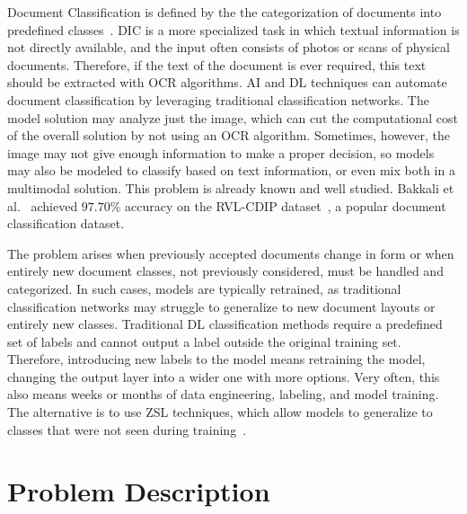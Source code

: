 Document Classification is defined by the the categorization of documents into predefined classes~\cite{liu_document_2021}. \gls{DIC} is a more specialized task in which textual information is not directly available, and the input often consists of photos or scans of physical documents. Therefore, if the text of the document is ever required, this text should be extracted with \gls{OCR} algorithms. \gls{AI} and \gls{DL} techniques can automate document classification by leveraging traditional classification networks. The model solution may analyze just the image, which can cut the computational cost of the overall solution by not using an \gls{OCR} algorithm. Sometimes, however, the image may not give enough information to make a proper decision, so models may also be modeled to classify based on text information, or even mix both in a multimodal solution. This problem is already known and well studied. Bakkali et al.~\cite{bakkali_eaml_2021} achieved $97.70\%$ accuracy on the RVL-CDIP dataset~\cite{harley_evaluation_2015}, a popular document classification dataset.

The problem arises when previously accepted documents change in form or when entirely new document classes, not previously considered, must be handled and categorized. In such cases, models are typically retrained, as traditional classification networks may struggle to generalize to new document layouts or entirely new classes. Traditional \gls{DL} classification methods require a predefined set of labels and cannot output a label outside the original training set. Therefore, introducing new labels to the model means retraining the model, changing the output layer into a wider one with more options. Very often, this also means weeks or months of data engineering, labeling, and model training. The alternative is to use \gls{ZSL} techniques, which allow models to generalize to classes that were not seen during training~\cite{xian_zero-shot_2019}.


\section{Problem Description}
\label{sec:problem}

